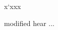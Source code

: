 \documentclass[12pt,a4paper]{article}
\begin{document}
% 
x`xxx

modified hear ...



\newpage


\end{document}
